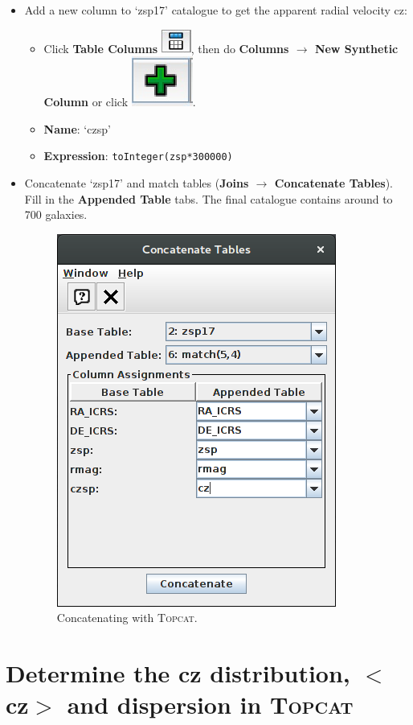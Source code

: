 \documentclass [a4paper, 12pt]{article}
\newcommand{\topcat}{{\textsc{Topcat}}}
\begin{document}
\begin{itemize}
\item Add a new column to `zsp17' catalogue to get the apparent radial velocity 
cz:
\begin{itemize}
    \item Click \textbf{Table Columns}  \includegraphics[width=0.04  
    \textwidth]{../images/topcat_button_metadata.jpg}, then do \textbf{Columns 
        $\rightarrow$ New Synthetic Column} or click  
        \includegraphics[width=0.04  
    \textwidth]{../images/topcat_button_add.jpg}.
    \item \textbf{Name}: `czsp'
    \item \textbf{Expression}: \texttt{toInteger(zsp*300000)}
\end{itemize}
\item Concatenate `zsp17' and match tables (\textbf{Joins $\rightarrow$ 
Concatenate Tables}). Fill in the \textbf{Appended Table} tabs. The final 
catalogue contains around to 700 galaxies.
\begin{figure}[H]
\center
\includegraphics[width=0.3  
\textwidth]{../images/topcat_concatenate_SDSS_Rines2003.png}
\caption{Concatenating with \topcat.}
\label{fig:topcatconcat}
\end{figure}
\end{itemize}

\section{Determine the cz distribution, $<$cz$>$ and dispersion in \topcat}
\end{document}
